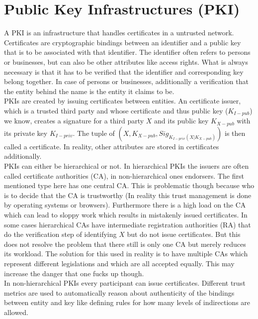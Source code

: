 
\section{Public Key Infrastructures (PKI)}
A PKI is an infrastructure that handles certificates in a untrusted network.
Certificates are cryptographic bindings between an identifier and a public key that is to be associated with that identifier.
The identifier often refers to persons or businesses, but can also be other attributes like access rights.
What is always necessary is that it has to be verified that the identifier and corresponding key belong together.
In case of persons or businesses, additionally a verification that the entity behind the name is the entity it claims to be.\\

PKIs are created by issuing certificates between entities.
An certificate issuer, which is a trusted third party and whose certificate and thus public key ($K_{I-pub}$) we know, creates a signature for a third party $X$ and its public key $K_{X-pub}$ with its private key $K_{I-priv}$.
The tuple of $(X,K_{X-pub},Sig_{K_{I-priv}(X|K_{X-pub})})$ is then called a certificate.
In reality, other attributes are stored in certificates additionally.\\

PKIs can either be hierarchical or not.
In hierarchical PKIs the issuers are often called certificate authorities (CA), in non-hierarchical ones endorsers.
The first mentioned type here has one central CA.
This is problematic though because who is to decide that the CA is trustworthy (In reality this trust management is done by operating systems or browsers).
Furthermore there is a high load on the CA which can lead to sloppy work which results in mistakenly issued certificates.
In some cases hierarchical CAs have intermediate registration authorities (RA) that do the verification step of identifying $X$ but do not issue certificates.
But this does not resolve the problem that there still is only one CA but merely reduces its workload.
The solution for this used in reality is to have multiple CAs which represent different legislations and which are all accepted equally.
This may increase the danger that one fucks up though.
\\
In non-hierarchical PKIs every participant can issue certificates.
Different trust metrics are used to automatically reason about authenticity of the bindings between entity and key like defining rules for how many levels of indirections are allowed.

